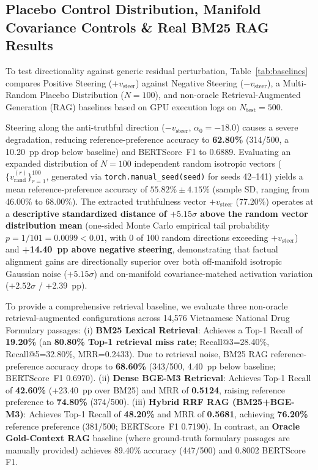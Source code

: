 \documentclass[conference]{IEEEtran}
\begin{document}
\subsection{Placebo Control Distribution, Manifold Covariance Controls \& Real BM25 RAG Results}
To test directionality against generic residual perturbation, Table~\ref{tab:baselines} compares Positive Steering ($+v_{\text{steer}}$) against Negative Steering ($-v_{\text{steer}}$), a Multi-Random Placebo Distribution ($N=100$), and non-oracle Retrieval-Augmented Generation (RAG) baselines based on GPU execution logs on $N_{\text{test}}=500$.

Steering along the anti-truthful direction ($-v_{\text{steer}}$, $\alpha_0=-18.0$) causes a severe degradation, reducing reference-preference accuracy to \textbf{62.80\%} (314/500, a 10.20~pp drop below baseline) and BERTScore~F1 to 0.6889. Evaluating an expanded distribution of $N=100$ independent random isotropic vectors ($\{v_{\text{rand}}^{(r)}\}_{r=1}^{100}$, generated via \texttt{torch.manual\_seed(seed)} for seeds 42--141) yields a mean reference-preference accuracy of \textbf{$55.82\% \pm 4.15\%$} (sample SD, ranging from 46.00\% to 68.00\%). The extracted truthfulness vector $+v_{\text{steer}}$ (77.20\%) operates at a \textbf{descriptive standardized distance of $+5.15\sigma$ above the random vector distribution mean} (one-sided Monte Carlo empirical tail probability $p=1/101=0.0099 < 0.01$, with 0 of 100 random directions exceeding $+v_{\text{steer}}$) and \textbf{+14.40~pp above negative steering}, demonstrating that factual alignment gains are directionally superior over both off-manifold isotropic Gaussian noise ($+5.15\sigma$) and on-manifold covariance-matched activation variation ($+2.52\sigma$ / +2.39~pp).

To provide a comprehensive retrieval baseline, we evaluate three non-oracle retrieval-augmented configurations across 14,576 Vietnamese National Drug Formulary passages: (i) \textbf{BM25 Lexical Retrieval}: Achieves a Top-1 Recall of \textbf{19.20\%} (an \textbf{80.80\% Top-1 retrieval miss rate}; Recall@3=28.40\%, Recall@5=32.80\%, MRR=0.2433). Due to retrieval noise, BM25 RAG reference-preference accuracy drops to \textbf{68.60\%} (343/500, 4.40~pp below baseline; BERTScore~F1 0.6970). (ii) \textbf{Dense BGE-M3 Retrieval}: Achieves Top-1 Recall of \textbf{42.60\%} (+23.40~pp over BM25) and MRR of \textbf{0.5124}, raising reference preference to \textbf{74.80\%} (374/500). (iii) \textbf{Hybrid RRF RAG (BM25+BGE-M3)}: Achieves Top-1 Recall of \textbf{48.20\%} and MRR of \textbf{0.5681}, achieving \textbf{76.20\%} reference preference (381/500; BERTScore~F1 0.7190). In contrast, an \textbf{Oracle Gold-Context RAG} baseline (where ground-truth formulary passages are manually provided) achieves 89.40\% accuracy (447/500) and 0.8002 BERTScore F1.
\end{document}
